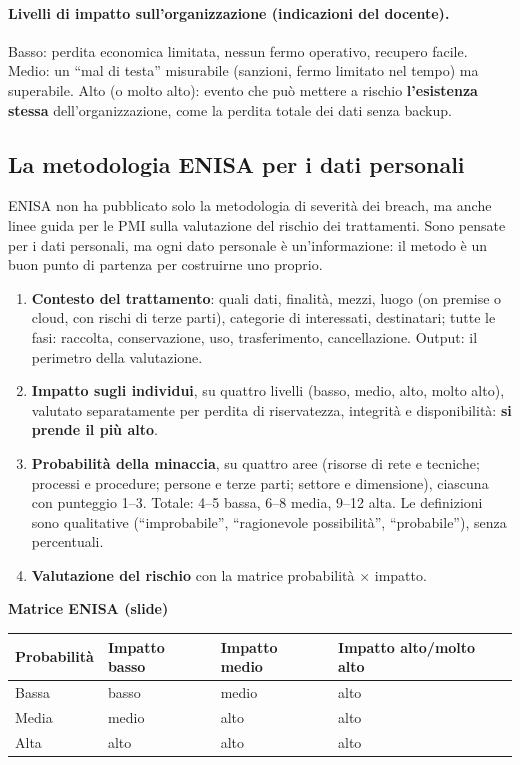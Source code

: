 \paragraph{Livelli di impatto sull'organizzazione (indicazioni del docente).} Basso: perdita economica
limitata, nessun fermo operativo, recupero facile. Medio: un ``mal di testa'' misurabile (sanzioni, fermo
limitato nel tempo) ma superabile. Alto (o molto alto): evento che può mettere a rischio
\textbf{l'esistenza stessa} dell'organizzazione, come la perdita totale dei dati senza backup.

\subsection{La metodologia ENISA per i dati personali}
ENISA non ha pubblicato solo la metodologia di severità dei breach, ma anche linee guida per le PMI sulla
valutazione del rischio dei trattamenti. Sono pensate per i dati personali, ma ogni dato personale è
un'informazione: il metodo è un buon punto di partenza per costruirne uno proprio.
\begin{enumerate}
  \item \textbf{Contesto del trattamento}: quali dati, finalità, mezzi, luogo (on premise o cloud, con
    rischi di terze parti), categorie di interessati, destinatari; tutte le fasi: raccolta, conservazione,
    uso, trasferimento, cancellazione. Output: il perimetro della valutazione.
  \item \textbf{Impatto sugli individui}, su quattro livelli (basso, medio, alto, molto alto), valutato
    separatamente per perdita di riservatezza, integrità e disponibilità: \textbf{si prende il più alto}.
  \item \textbf{Probabilità della minaccia}, su quattro aree (risorse di rete e tecniche; processi e
    procedure; persone e terze parti; settore e dimensione), ciascuna con punteggio 1--3. Totale: 4--5
    bassa, 6--8 media, 9--12 alta. Le definizioni sono qualitative (``improbabile'', ``ragionevole
    possibilità'', ``probabile''), senza percentuali.
  \item \textbf{Valutazione del rischio} con la matrice probabilità $\times$ impatto.
\end{enumerate}

\begin{center}
\small
\textbf{Matrice ENISA (slide)}\par\smallskip
\begin{tabular}{llll}
\toprule
\textbf{Probabilità} & \textbf{Impatto basso} & \textbf{Impatto medio} & \textbf{Impatto alto/molto alto} \\ \midrule
Bassa & basso & medio & alto \\
Media & medio & alto & alto \\
Alta  & alto & alto & alto \\ \bottomrule
\end{tabular}
\end{center}

